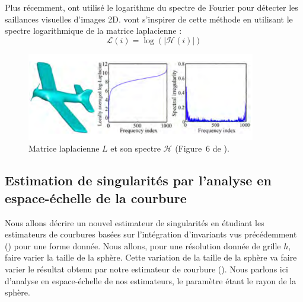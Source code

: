 Plus récemment,  ont utilisé le logarithme du spectre de Fourier pour détecter les saillances visuelles d'images 2D.  vont s'inspirer de cette méthode en utilisant le spectre logarithmique de la matrice laplacienne :
\begin{equation}
  \mathcal{L}(i) = \log(|\mathcal{H}(i)|)
\end{equation}

\begin{figure}[ht]{
    \begin{center}
    \includegraphics[width=10cm]{images/Feature/LaplacianSpectrumLogAvg}
    \end{center}}
    \caption[Matrice laplacienne et son spectre.]{Matrice laplacienne $L$ et son spectre $\mathcal{H}$ (Figure~6 de \cite{Song2014}).
      \label{fig:laplacian-spectrum-avg}}
\end{figure}

\subsection{Estimation de singularités par l'analyse en espace-échelle de la
courbure} %
\label{sec:applications:feature:II}

Nous allons décrire un nouvel estimateur de singularités\cite{SMI2015} en
étudiant les estimateurs de courbures basées sur l'intégration d'invariants vus
précédemment () pour une forme donnée. Nous
allons, pour une résolution donnée de grille $h$, faire varier la taille de la
sphère. Cette variation de la taille de la sphère va faire varier le résultat
obtenu par notre estimateur de courbure ().
Nous parlons ici d'analyse en espace-échelle de nos estimateurs, le paramètre
étant le rayon de la sphère.

